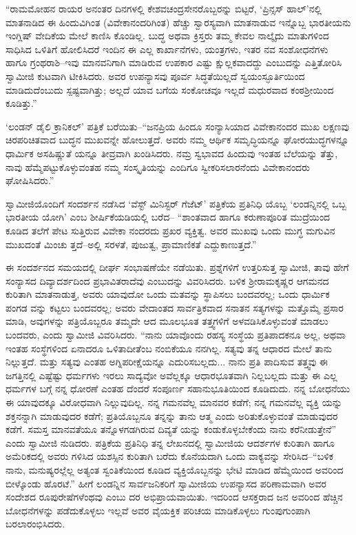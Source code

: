 “ರಾಮಮೋಹನ ರಾಯರ ಅನಂತರ ದಿನಗಳಲ್ಲಿ ಕೇಶವಚಂದ್ರಸೇನರೊಬ್ಬರನ್ನು ಬಿಟ್ಟರೆ, ‘ಪ್ರಿನ್ಸಸ್ ಹಾಲ್​’ನಲ್ಲಿ ಮಾತನಾಡಿದ ಈ ಹಿಂದುವಿಗಿಂತ (ವಿವೇಕಾನಂದರಿಗಿಂತ) ಹೆಚ್ಚು ಸ್ವಾರಸ್ಯವಾಗಿ ಮಾತನಾಡುವ ಇನ್ನೊಬ್ಬ ಭಾರತೀಯನು ಇಂಗ್ಲಿಷ್ ವೇದಿಕೆಯ ಮೇಲೆ ಕಾಣಿಸಿ ಕೊಂಡಿಲ್ಲ. ಬುದ್ಧ ಅಥವಾ ಕ್ರಿಸ್ತರು ತಮ್ಮ ಕೇವಲ ನಾಲ್ಕೈದು ಮಾತುಗಳಿಂದ ಸಾಧಿಸಿದ ಒಳಿತಿಗೆ ಹೋಲಿಸಿದರೆ ಇಂದಿನ ಈ ಎಲ್ಲ ಕಾರ್ಖಾನೆಗಳು, ಯಂತ್ರಗಳು, ಇತರ ನವ ಸಂಶೋಧನೆಗಳು ಹಾಗೂ ಗ್ರಂಥರಾಶಿ–ಇವು ಮಾನವನಿಗಾಗಿ ಮಾಡಿರುವ ಉಪಕಾರ ಎಷ್ಟು ಕ್ಷುಲ್ಲಕವಾದದ್ದು ಎಂಬುದನ್ನು ಎತ್ತಿತೋರಿಸಿ ಸ್ವಾಮೀಜಿ ಕುಟವಾಗಿ ಟೀಕಿಸಿದರು. ಅವರ ಉಪನ್ಯಾಸವು ಪೂರ್ವ ಸಿದ್ಧತೆಯಿಲ್ಲದೆ ಸ್ವಯಂಸ್ಫೂರ್ತಿಯಿಂದ ಮಾಡಿದುದೆಂಬುದು ಸ್ಪಷ್ಟವಾಗಿತ್ತು; ಅಲ್ಲದೆ ಯಾವ ಬಗೆಯ ಸಂಕೋಚವೂ ಇಲ್ಲದೆ ಮಧುರವಾದ ಕಂಠಶ್ರೀಯಿಂದ ಕೂಡಿತ್ತು.”

‘ಲಂಡನ್ ಡೈಲಿ ಕ್ರಾನಿಕಲ್​’ ಪತ್ರಿಕೆ ಬರೆಯಿತು–“ಜನಪ್ರಿಯ ಹಿಂದೂ ಸಂನ್ಯಾಸಿಯಾದ ವಿವೇಕಾನಂದರ ಮುಖ ಲಕ್ಷಣವು ಚಿರಪರಿಚಿತವಾದ ಬುದ್ಧನ ಮುಖವನ್ನೇ ಹೋಲುತ್ತದೆ. ಅವರು ನಮ್ಮ ಆರ್ಥಿಕ ಸಮೃದ್ಧಿಯನ್ನೂ ಘೋರಯುದ್ಧಗಳನ್ನೂ ಧಾರ್ಮಿಕ ಅಸಹಿಷ್ಣುತೆ ಯನ್ನೂ ತೀವ್ರವಾಗಿ ಖಂಡಿಸಿದರು. ನಮ್ರ ಸ್ವಭಾವದ ಹಿಂದುವು ಇಂತಹ ಬೆಲೆಯನ್ನು ತೆತ್ತು, ನಾವು ಹೆಮ್ಮೆಪಟ್ಟುಕೊಳ್ಳುವಂತಹ ನಮ್ಮ ಸಂಸ್ಕೃತಿಯನ್ನು ಎಂದಿಗೂ ಸ್ವೀಕರಿಸಲಾರನೆಂದು ವಿವೇಕಾನಂದರು ಘೋಷಿಸಿದರು.”

ಸ್ವಾಮೀಜಿಯೊಂದಿಗೆ ಸಂದರ್ಶನ ನಡೆಸಿದ ‘ವೆಸ್ಟ್ ಮಿನಿಸ್ಟರ್ ಗೆಜೆಟ್​’ ಪತ್ರಿಕೆಯ ಪ್ರತಿನಿಧಿ ಯೊಬ್ಬ ‘ಲಂಡನ್ನಿನಲ್ಲಿ ಒಬ್ಬ ಭಾರತೀಯ ಯೋಗಿ’ ಎಂಬ ಶೀರ್ಷಿಕೆಯಡಿಯಲ್ಲಿ ಬರೆದ– “ಶಾಂತವಾದ ಹಾಗೂ ಕರುಣಾಪೂರಿತ ಮುದ್ರೆಯಿಂದ ಕೂಡಿದ ತಲೆಗೆ ಪೇಟ ಸುತ್ತಿರುವ ವಿವೇಕಾ ನಂದರದು ಪ್ರಖರ ವ್ಯಕ್ತಿತ್ವ. ಅವರ ಮುಖವು ಒಂದು ಮುಗ್ಧ ಮಗುವಿನ ಮುಖದಂತೆ ಮಿಂಚು ತ್ತದೆ–ಅಲ್ಲಿ ಸರಳತೆ, ಪುಜುತ್ವ, ಪ್ರಾಮಾಣಿಕತೆ ಎದ್ದುಕಾಣುತ್ತದೆ.”

ಈ ಸಂದರ್ಶನದ ಸಮಯದಲ್ಲಿ ದೀರ್ಘ ಸಂಭಾಷಣೆಯೇ ನಡೆಯಿತು. ಪ್ರಶ್ನೆಗಳಿಗೆ ಉತ್ತರಿಸುತ್ತ ಸ್ವಾಮೀಜಿ, ತಾವು ಹೇಗೆ ಸಂನ್ಯಾಸದ ದಿವ್ಯಾದರ್ಶದಿಂದ ಪ್ರಭಾವಿತರಾದೆವು ಎಂಬುದನ್ನು ವಿವರಿಸಿದರು. ಬಳಿಕ ಶ್ರೀರಾಮಕೃಷ್ಣರ ಆಗಮನದ ಕುರಿತಾಗಿ ಮಾತನಾಡುತ್ತ, ಅವರು ಯಾವುದೋ ಒಂದು ಮತವನ್ನು ಸ್ಥಾಪಿಸಲು ಬಂದವರಲ್ಲ; ಒಂದು ಧಾರ್ಮಿಕ ಪಂಗಡ ವನ್ನು ಕಟ್ಟಲು ಬಂದವರಲ್ಲ; ಅವರು ವೇದಾಂತದ ಸಾರ್ವತ್ರಿಕವಾದ ಸನಾತನ ಸತ್ಯಗಳನ್ನು ಮತ್ತೊಮ್ಮೆ ಪ್ರಸಾರ ಮಾಡಿ, ಅವುಗಳನ್ನು ಪತ್ರಿಯೊಬ್ಬರೂ ತಮ್ಮದೇ ಆದ ಮೂಲಭೂತ ತತ್ತ್ವಗಳಿಗೆ ಅಳವಡಿಸಿಕೊಳ್ಳುವಂತೆ ಮಾಡಲು ಬಂದವರು, ಎಂದು ಸ್ವಾಮೀಜಿ ವಿವರಿಸಿದರು. “ನಾನು ಯಾವೊಂದು ರಹಸ್ಯ ಸಂಸ್ಥೆಯ ಪ್ರತಿಪಾದಕನೂ ಅಲ್ಲ, ಅಥವಾ ಇಂತಹ ಸಂಸ್ಥೆಗಳಿಂದ ಏನಾದರೂ ಒಳಿತಾದೀತೆಂಬ ನಂಬಿಕೆಯೂ ನನಗಿಲ್ಲ. ಸತ್ಯವು ತನ್ನ ಆಧಾರದ ಮೇಲೆ ತಾನು ನಿಲ್ಲುತ್ತದೆ. ಮತ್ತು ಸತ್ಯವು ಎಂತಹ ಅಗ್ನಿಪರೀಕ್ಷೆಯನ್ನೂ ಎದುರಿಸಬಲ್ಲದು... ನಾನು ಪ್ರತಿ ಪಾದಿಸುವ ತತ್ತ್ವವು ಈ ಜಗತ್ತಿನಲ್ಲಿ ಎಷ್ಟೆಷ್ಟು ಧರ್ಮಗಳು ಇರಲು ಸಾದ್ಯವೋ ಅವೆಲ್ಲಕ್ಕೂ ಆಧಾರಭೂತವಾಗಿ ನಿಲ್ಲಬಲ್ಲದು ಮತ್ತು ಈ ಎಲ್ಲ ಧರ್ಮಗಳ ಬಗ್ಗೆ ನನ್ನ ಧೋರಣೆ ಎಂತಹ ದೆಂದರೆ ಸಂಪೂರ್ಣ ಸಹಾನುಭೂತಿಯಿಂದ ಕೂಡಿದುದು. ನನ್ನ ಬೋಧನೆಯು ಈ ಯಾವುದಕ್ಕೂ ವಿರೋಧವಾಗಿ ನಿಲ್ಲುವುದಿಲ್ಲ. ನನ್ನ ಗಮನವೆಲ್ಲ ಮಾನವರ ಕಡೆಗೆ; ನನ್ನ ಗಮನವೆಲ್ಲ ವ್ಯಕ್ತಿ ಯನ್ನು ಶಕ್ತನನ್ನಾಗಿ ಮಾಡುವುದರ ಕಡೆಗೆ; ಪ್ರತಿಯೊಬ್ಬನೂ ತನ್ನನ್ನು ತಾನು ಆತ್ಮ ಎಂದು ಅರಿತುಕೊಳ್ಳುವಂತೆ ಮಾಡುವುದರ ಕಡೆಗೆ. ಸಮಸ್ತ ಮಾನವತೆಯೂ ತನ್ನೊಳಗಡಗಿರುವ ದಿವ್ಯತೆ ಯನ್ನು ಕಂಡುಕೊಳ್ಳಬೇಕೆಂದು ನಾನು ಕರೆನೀಡುತ್ತೇನೆ” ಎಂದು ಸ್ವಾಮೀಜಿ ನುಡಿದರು. ಪತ್ರಿಕೆಯ ಪ್ರತಿನಿಧಿ ತನ್ನ ಲೇಖನದಲ್ಲಿ ಸ್ವಾಮೀಜಿಯ ಆದರ್ಶಗಳ ಕುರಿತಾಗಿ ಹಾಗೂ ಅಮೆರಿಕದಲ್ಲಿ ಅವರು ಗಳಿಸಿದ ಯಶಸ್ಸಿನ ಕುರಿತಾಗಿ ಬರೆದು ಕೊನೆಯದಾಗಿ ಒಂದು ವಾಕ್ಯವನ್ನು ಸೇರಿಸಿದ–“ಬಳಿಕ ನಾನು, ಮನುಷ್ಯರಲ್ಲೆಲ್ಲ ಅತ್ಯಂತ ಸ್ವಂತಿಕೆಯಿಂದ ಕೂಡಿದ ವ್ಯಕ್ತಿಯೊಬ್ಬನನ್ನು ಭೇಟಿ ಮಾಡಿದ ಹೆಮ್ಮೆಯಿಂದ ಅವರಿಂದ ಬೀಳ್ಕೊಂಡು ಹೊರಟೆ.” ಹೀಗೆ ಲಂಡನ್ನಿನ ಸಾರ್ವಜನಿಕರಿಗೆ ಸ್ವಾಮೀಜಿಯ ಉಪನ್ಯಾಸದ ಪರಿಣಾಮವಾಗಿ ಅವರ ಸಂದೇಶದ ರೂಪುರೇಷೆಗಳೆಂಥವು ಎಂಬು ದರ ಅಭಿಪ್ರಾಯವಾಯಿತು. ಇದರಿಂದ ಆಸಕ್ತರಾದ ಜನ ಅವರಿಂದ ಹೆಚ್ಚಿನ ಬೋಧನೆಗಳನ್ನು ಪಡೆದುಕೊಳ್ಳಲು ಇಲ್ಲವೆ ಅವರ ವೈಯಕ್ತಿಕ ಪರಿಚಯ ಮಾಡಿಕೊಳ್ಳಲು ಗುಂಪುಗುಂಪಾಗಿ ಬರಲಾರಂಭಿಸಿದರು.

